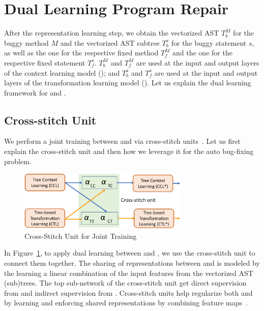 \section{Dual Learning Program Repair}



After the representation learning step, we obtain the vectorized AST
$T^{M}_b$ for the buggy method $M$ and the vectorized AST subtree
$T^{s}_b$ for the buggy statement $s$, as well as the one for the
respective fixed method $T^{M}_f$ and the one for the respective fixed
statement $T^{s}_f$. $T^{M}_b$ and $T^{M}_f$ are used at the input and
output layers of the context learning model (); and
$T^{s}_b$ and $T^{s}_f$ are used at the input and output layers of the
transformation learning model (). Let us explain the dual
learning framework for  and .



\subsection{Cross-stitch Unit}

We perform a joint training between  and  via
cross-stitch units~\cite{misra2016cross}. Let us first explain the
cross-stitch unit and then how we leverage it for the auto bug-fixing
problem.

\begin{figure}[t]
	\centering
	\includegraphics[width=3.2in]{graphs/cross-stitch}
	\caption{Cross-Stitch Unit for Joint Training~\cite{misra2016cross}}
	\label{fig:cross-stitch}
\end{figure}

In Figure~\ref{fig:cross-stitch}, to apply dual learning between
 and , we use the cross-stitch unit to connect
them together. The sharing of representations between  and
 is modeled by the learning a linear combination of the
input features from the vectorized AST (sub)trees. The top sub-network
of the cross-stitch unit get direct supervision from  and
indirect supervision from . Cross-stitch units help
regularize both  and  by learning and enforcing
shared representations by combining feature
maps~\cite{misra2016cross}.

